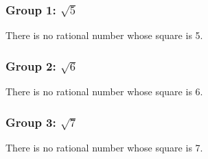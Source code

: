 \subsubsection{Group 1: $\sqrt{5}$}
\begin{theorem}
There is no rational number whose square is 5.
\end{theorem}
\subsubsection{Group 2: $\sqrt{6}$}
\begin{theorem}
There is no rational number whose square is 6.
\end{theorem}
\subsubsection{Group 3: $\sqrt{7}$}
\begin{theorem}
There is no rational number whose square is 7.
\end{theorem}

